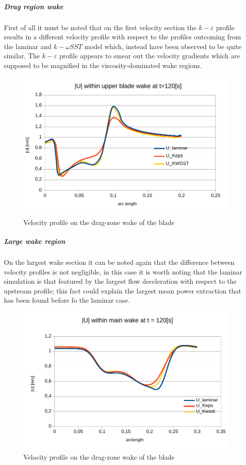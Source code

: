 \documentclass[a4paper,12pt]{article}
\begin{document}
\subparagraph{Drag region wake}
First of all it must be noted that on the first velocity section the $k-\varepsilon$ profile results in a different velocity profile with respect to the profiles outcoming from the laminar and $k-\omega SST$ model which, instead have been observed to be quite similar.
The $k-\varepsilon$ profile appears to smear out the velocity gradients which are supposed to be magnified in the viscosity-dominated wake regions.

\begin{figure}[H]
\centering
\includegraphics[width=14cm]{images/turbulence/UpperbladeWake.pdf} 
\caption{Velocity profile on the drag-zone wake of the blade}
\centering
\end{figure}

\subparagraph{Large wake region}
On the largest wake section it can be noted again that the difference between velocity profiles is not negligible, in this case it is worth noting that the laminar simulation is that featured by the largest flow deceleration with respect to the upstream profile; this fact could explain the largest mean power extraction that has been found before fo the laminar case.

\begin{figure}[H]
\centering
\includegraphics[width=14cm]{images/turbulence/U_mag_MainWake.pdf} 
\caption{Velocity profile on the drag-zone wake of the blade}
\centering
\end{figure}
\end{document}
